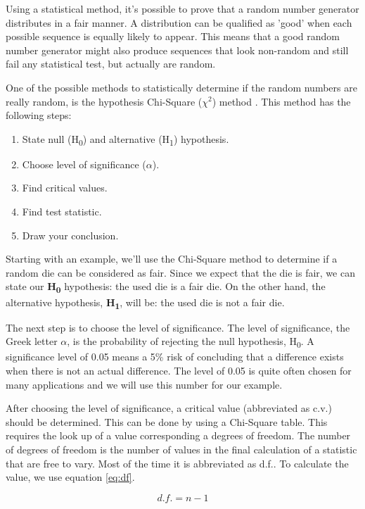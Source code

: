 Using a statistical method, it's possible to prove that a random number generator distributes in a fair manner. A distribution can be qualified as 'good' when each possible sequence is equally likely to appear. This means that a good random number generator might also produce sequences that look non-random and still fail any statistical test, but actually are random.

One of the possible methods to statistically determine if the random numbers are really random, is the hypothesis Chi-Square (${\chi}^2$) method \cite{chisquareRandom} \cite{chisquare}. This method has the following steps:

\begin{enumerate}
	\itemsep0em
	\item State null (H\textsubscript{0}) and alternative (H\textsubscript{1}) hypothesis.
	\item Choose level of significance ($\alpha$).
	\item Find critical values.
	\item Find test statistic.
	\item Draw your conclusion.
\end{enumerate}

Starting with an example, we'll use the Chi-Square method to determine if a random die can be considered as fair. Since we expect that the die is fair, we can state our \textbf{H\textsubscript{0}} hypothesis: the used die is a fair die. On the other hand, the alternative hypothesis, \textbf{H\textsubscript{1}}, will be: the used die is not a fair die.

The next step is to choose the level of significance. The level of significance, the Greek letter $\alpha$, is the probability of rejecting the null hypothesis, H\textsubscript{0}. A significance level of 0.05 means a 5\% risk of concluding that a difference exists when there is not an actual difference. The level of 0.05 is quite often chosen for many applications and we will use this number for our example.

After choosing the level of significance, a critical value (abbreviated as c.v.) should be determined. This can be done by using a Chi-Square table. This requires the look up of a value corresponding a degrees of freedom. The number of degrees of freedom is the number of values in the final calculation of a statistic that are free to vary. Most of the time it is abbreviated as d.f.. To calculate the value, we use equation \ref{eq:df}.

\begin{equation}\label{eq:df}
d.f. = n - 1
\end{equation}

